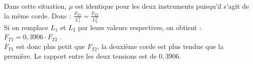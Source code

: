 %
%
    Dans cette situation, \(\mu\) est identique pour les deux instruments puisqu'il s'agit de la même corde. Donc :
    \(\frac{F_{T1}}{L_1 ^2}=\frac{F_{T2}}{L_2 ^2}\) \\
    Si on remplace \(L_1\) et \(L_2\) par leurs valeurs respectives, on obtient :\\
    \(F_{T1}=0,3906 \cdot F_{T2}\) .\\
    \(F_{T1}\) est donc plus petit que \(F_{T2}\), la deuxième corde est plus tendue que la première. Le rapport entre les deux tensions est de \(0,3906\).
